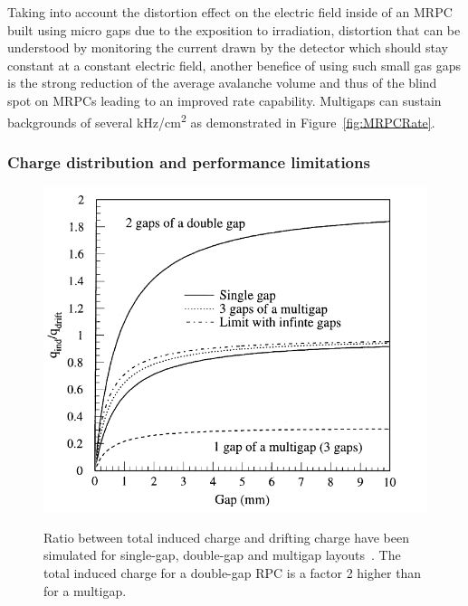 \endgroup
	
	Taking into account the distortion effect on the electric field inside of an MRPC built using micro gaps due to the exposition to irradiation, distortion that can be understood by monitoring the current drawn by the detector which should stay constant at a constant electric field, another benefice of using such small gas gaps is the strong reduction of the average avalanche volume and thus of the blind spot on MRPCs leading to an improved rate capability. Multigaps can sustain backgrounds of several \si{kHz/cm^2} as demonstrated in Figure~\ref{fig:MRPCRate}.
	
		\subsubsection{Charge distribution and performance limitations}
		\label{chapt3:sssec:charge}
	
\begingroup\setlength{\intextsep}{0pt}\setlength{\columnsep}{15pt}
	
	\begin{figure}
		\centering
		\includegraphics[width = \linewidth]{fig/chapt3/Layout_charge_ratio.png}\\
		\caption{\label{fig:ChargeRatio} Ratio between total induced charge and drifting charge have been simulated for single-gap, double-gap and multigap layouts~\cite{ABBRESCIA99}. The total induced charge for a double-gap RPC is a factor 2 higher than for a multigap.}
	\end{figure}
		
